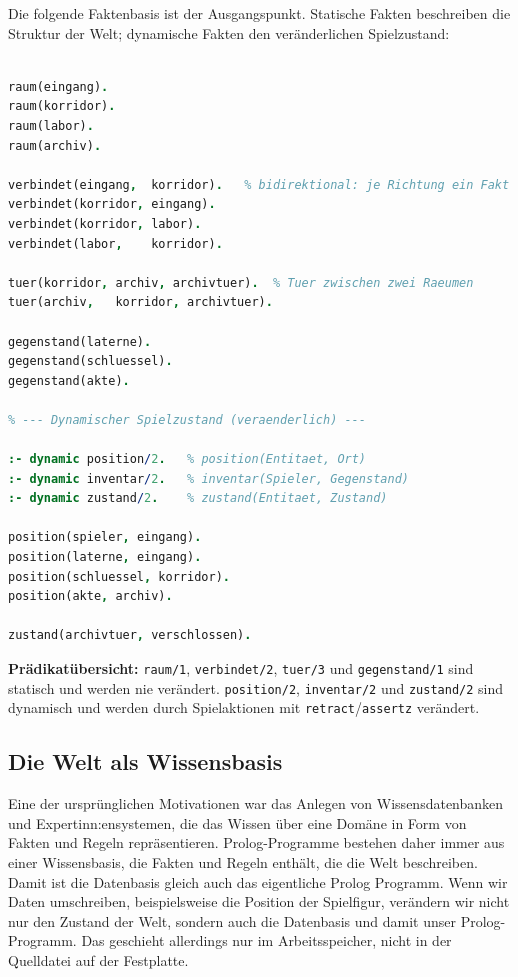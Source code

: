 \documentclass[parskip=half,a4paper,11pt]{scrreprt}
\begin{document}
Die folgende Faktenbasis ist der Ausgangspunkt. Statische Fakten beschreiben die Struktur der Welt; dynamische Fakten den veränderlichen Spielzustand:\\
\begin{lstlisting}[language=Prolog, caption={}]
% --- Statisches Weltmodell (unveraenderlich) ---

raum(eingang).
raum(korridor).
raum(labor).
raum(archiv).

verbindet(eingang,  korridor).   % bidirektional: je Richtung ein Fakt
verbindet(korridor, eingang).
verbindet(korridor, labor).
verbindet(labor,    korridor).

tuer(korridor, archiv, archivtuer).  % Tuer zwischen zwei Raeumen
tuer(archiv,   korridor, archivtuer).

gegenstand(laterne).
gegenstand(schluessel).
gegenstand(akte).

% --- Dynamischer Spielzustand (veraenderlich) ---

:- dynamic position/2.   % position(Entitaet, Ort)
:- dynamic inventar/2.   % inventar(Spieler, Gegenstand)
:- dynamic zustand/2.    % zustand(Entitaet, Zustand)

position(spieler, eingang).
position(laterne, eingang).
position(schluessel, korridor).
position(akte, archiv).

zustand(archivtuer, verschlossen).
\end{lstlisting}

\noindent
\textbf{Prädikatübersicht:} \texttt{raum/1}, \texttt{verbindet/2}, \texttt{tuer/3} und \texttt{gegenstand/1} sind statisch und werden nie verändert. \texttt{position/2}, \texttt{inventar/2} und \texttt{zustand/2} sind dynamisch und werden durch Spielaktionen mit \texttt{retract}/\texttt{assertz} verändert.

\subsection{Die Welt als Wissensbasis}
Eine der ursprünglichen Motivationen war das Anlegen von Wissensdatenbanken und Expertinn:ensystemen, die das Wissen über eine Domäne in Form von Fakten und Regeln repräsentieren. Prolog-Programme bestehen daher immer aus einer Wissensbasis, die Fakten und Regeln enthält, die die Welt beschreiben. Damit ist die Datenbasis gleich auch das eigentliche Prolog Programm. Wenn wir Daten umschreiben, beispielsweise die Position der Spielfigur, verändern wir nicht nur den Zustand der Welt, sondern auch die Datenbasis und damit unser Prolog-Programm. Das geschieht allerdings nur im Arbeitsspeicher, nicht in der Quelldatei auf der Festplatte.
\end{document}
